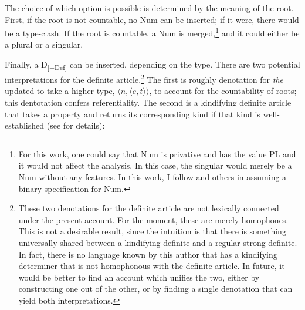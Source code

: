 \documentclass[output=paper,
modfonts
]{langscibook}
\begin{document}
\begin{exe}
\end{exe}

The choice of which option is possible is determined by the meaning of the root. First, if the root is not countable, no Num can be inserted; if it were, there would be a type-clash. If the root is countable, a Num is merged,\footnote{For this work, one could say that Num is privative and has the value PL and it would not affect the analysis. In this case, the singular would merely be a Num without any features. In this work, I follow \citet{Harbour2007} and others in assuming a binary specification for Num.} and it could either be a plural or a singular. 

Finally, a D\textsubscript{[+Def]} can be inserted, depending on the type. There are two potential interpretations for the definite article.\footnote{These two denotations for the definite article are not lexically connected under the present account. For the moment, these are merely homophones. This is not a desirable result, since the intuition is that there is something universally shared between a kindifying definite and a regular strong definite. In fact, there is no language known by this author that has a kindifying determiner that is not homophonous with the definite article. In future, it would be better to find an account which unifies the two, either by constructing one out of the other, or by finding a single denotation that can yield both interpretations.} The first is roughly  denotation for \textit{the} updated to take a higher type, $\langle n, \langle e,t \rangle \rangle$, to account for the countability of roots; this dentotation confers referentiality. The second is a kindifying definite article that takes a property and returns its corresponding kind if that kind is well-established (see \citealt{Chierchia1998} for details):

\begin{exe}
\end{exe}
\end{document}
